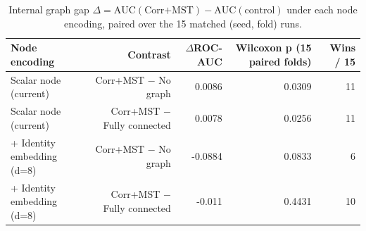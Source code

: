\begin{table}[t]
\centering
\caption{Internal graph gap $\Delta=\mathrm{AUC}(\text{Corr+MST})-\mathrm{AUC}(\text{control})$ under each node encoding, paired over the 15 matched (seed, fold) runs.}
\label{tab:nodeidgap}
\footnotesize
\begin{tabular}{lrrrr}
\toprule
Node encoding & Contrast & $\Delta$ROC-AUC & Wilcoxon p (15 paired folds) & Wins / 15 \\
\midrule
Scalar node (current) & Corr+MST $-$ No graph & 0.0086 & 0.0309 & 11 \\
Scalar node (current) & Corr+MST $-$ Fully connected & 0.0078 & 0.0256 & 11 \\
+ Identity embedding (d=8) & Corr+MST $-$ No graph & -0.0884 & 0.0833 & 6 \\
+ Identity embedding (d=8) & Corr+MST $-$ Fully connected & -0.011 & 0.4431 & 10 \\
\bottomrule
\end{tabular}
\end{table}
